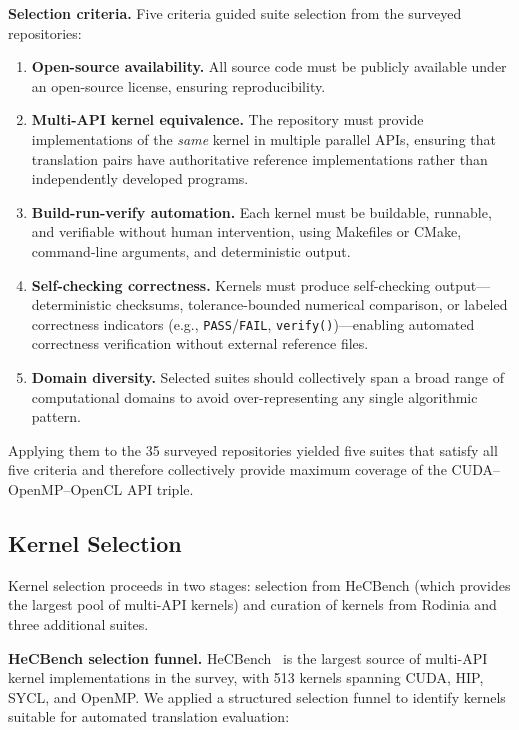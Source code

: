 \documentclass{article}
\begin{document}
\textbf{Selection criteria.} Five criteria guided suite selection from the surveyed repositories:

\begin{enumerate}
\item \textbf{Open-source availability.} All source code must be publicly available under an open-source license, ensuring reproducibility.
\item \textbf{Multi-API kernel equivalence.} The repository must provide implementations of the \emph{same} kernel in multiple parallel APIs, ensuring that translation pairs have authoritative reference implementations rather than independently developed programs.
\item \textbf{Build-run-verify automation.} Each kernel must be buildable, runnable, and verifiable without human intervention, using Makefiles or CMake, command-line arguments, and deterministic output.
\item \textbf{Self-checking correctness.} Kernels must produce self-checking output---deterministic checksums, tolerance-bounded numerical comparison, or labeled correctness indicators (e.g., \texttt{PASS}/\texttt{FAIL}, \texttt{verify()})---enabling automated correctness verification without external reference files.
\item \textbf{Domain diversity.} Selected suites should collectively span a broad range of computational domains to avoid over-representing any single algorithmic pattern.
\end{enumerate}

Applying them to the 35 surveyed repositories yielded five suites that satisfy all five criteria and therefore collectively provide maximum coverage of the CUDA--OpenMP--OpenCL API triple.

\subsection{Kernel Selection}
\label{sec:kernel-selection}

Kernel selection proceeds in two stages: selection from HeCBench (which provides the largest pool of multi-API kernels) and curation of kernels from Rodinia and three additional suites.

\textbf{HeCBench selection funnel.} HeCBench~\cite{HeCBench2023} is the largest source of multi-API kernel implementations in the survey, with 513 kernels spanning CUDA, HIP, SYCL, and OpenMP. We applied a structured selection funnel to identify kernels suitable for automated translation evaluation:
\end{document}
